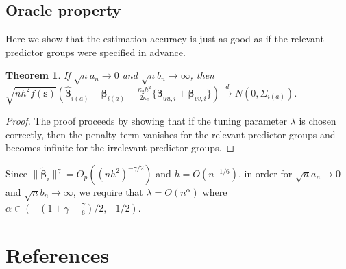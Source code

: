\documentclass[authoryear, review, 11pt]{elsarticle}
\newtheorem{theorem}{Theorem}[section]
\begin{document}
  \subsection{Oracle property}
    Here we show that the estimation accuracy is just as good as if the relevant predictor groups were specified in advance.

    \begin{theorem}
      If $\sqrt{n} a_n \to 0$ and $\sqrt{n} b_n \to \infty$, then $\sqrt{n h^2 f(\bm{s})} \left( \hat{\bm{\beta}}_{i(a)} - \bm{\beta}_{i(a)} - \frac{\kappa_2 h^2}{2 \kappa_0} \{ \bm{\beta}_{uu,i} + \bm{\beta}_{vv,i} \} \right) \xrightarrow{d} N(0,\Sigma_{i(a)})$.
    \end{theorem}

    \begin{proof}
      The proof proceeds by showing that if the tuning parameter $\lambda$ is chosen correctly, then the penalty term vanishes for the relevant predictor groups and becomes infinite for the irrelevant predictor groups.

    \end{proof}

    Since $ \| \tilde{\bm{\beta}}_{i} \|^{\gamma} = O_p\left( ( n h^2 )^{-\gamma / 2} \right) $ and $h = O(n^{-1/6})$, in order for $\sqrt{n} a_n \to 0$ and $\sqrt{n} b_n \to \infty$, we require that $\lambda = O(n^{\alpha})$ where $\alpha \in \left( -(1 + \gamma - \frac{\gamma}{6})/2, -1/2 \right) $.

\section{References}


\end{document}
